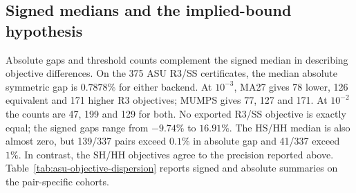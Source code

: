 \documentclass[pdflatex,sn-mathphys-num]{sn-jnl}
\theoremstyle{thmstyleone}
\theoremstyle{thmstylethree}
\newenvironment{scaledtable}[1][tbp]{\begin{tableorg}[#1]\centering}{\end{tableorg}}
\begin{document}
\subsection{Signed medians and the implied-bound hypothesis}\label{app:asu-bound-hypothesis}
Absolute gaps and threshold counts complement the signed median in
describing objective differences.
On the 375 ASU R3/SS
certificates, the median absolute symmetric gap is $0.7878\%$ for either
backend. At $10^{-3}$, MA27 gives 78 lower, 126 equivalent and 171 higher
R3 objectives; MUMPS gives 77, 127 and 171. At $10^{-2}$ the counts are
47, 199 and 129 for both. No exported R3/SS objective is exactly equal;
the signed gaps range from $-9.74\%$ to $16.91\%$.
The HS/HH median is also almost zero, but 139/337 pairs exceed $0.1\%$
in absolute gap and 41/337 exceed $1\%$. In contrast, the SH/HH objectives
agree to the precision reported above. Table~\ref{tab:asu-objective-dispersion}
reports signed and absolute summaries on the pair-specific cohorts.

\begin{scaledtable}[!htbp]
\centering\footnotesize
\caption{ASU objective dispersion on common original certificates.
Signed and absolute medians are in percent. L/E/H refers
to the first policy in each pair; the two thresholds are dimensionless.}
\label{tab:asu-objective-dispersion}
\end{scaledtable}
\end{document}
